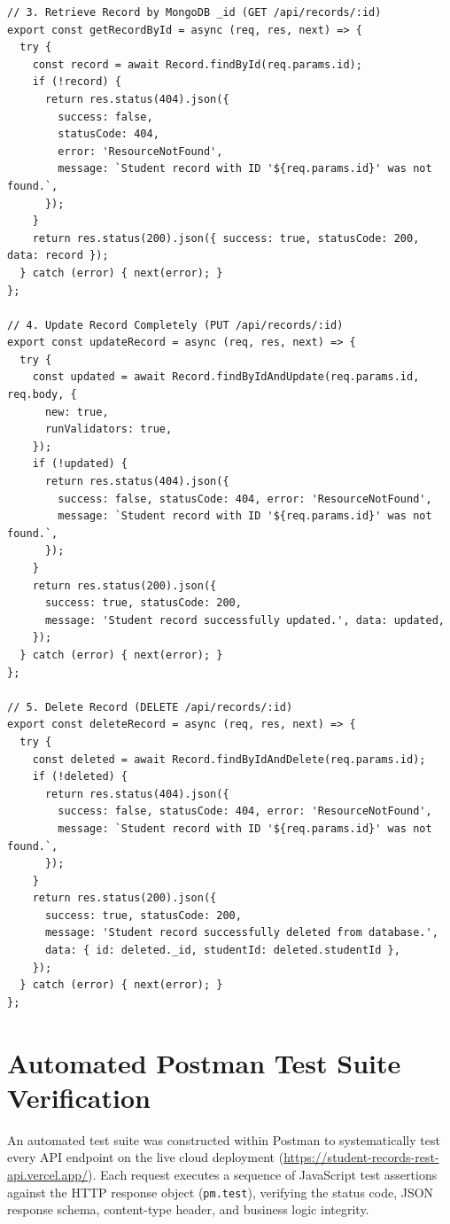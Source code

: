 \documentclass[11pt,a4paper]{article}
\begin{document}
\begin{lstlisting}[caption={RESTful CRUD Business Logic and Validation Handlers (\texttt{controllers/recordController.js})}]
// 3. Retrieve Record by MongoDB _id (GET /api/records/:id)
export const getRecordById = async (req, res, next) => {
  try {
    const record = await Record.findById(req.params.id);
    if (!record) {
      return res.status(404).json({
        success: false,
        statusCode: 404,
        error: 'ResourceNotFound',
        message: `Student record with ID '${req.params.id}' was not found.`,
      });
    }
    return res.status(200).json({ success: true, statusCode: 200, data: record });
  } catch (error) { next(error); }
};

// 4. Update Record Completely (PUT /api/records/:id)
export const updateRecord = async (req, res, next) => {
  try {
    const updated = await Record.findByIdAndUpdate(req.params.id, req.body, {
      new: true,
      runValidators: true,
    });
    if (!updated) {
      return res.status(404).json({
        success: false, statusCode: 404, error: 'ResourceNotFound',
        message: `Student record with ID '${req.params.id}' was not found.`,
      });
    }
    return res.status(200).json({
      success: true, statusCode: 200,
      message: 'Student record successfully updated.', data: updated,
    });
  } catch (error) { next(error); }
};

// 5. Delete Record (DELETE /api/records/:id)
export const deleteRecord = async (req, res, next) => {
  try {
    const deleted = await Record.findByIdAndDelete(req.params.id);
    if (!deleted) {
      return res.status(404).json({
        success: false, statusCode: 404, error: 'ResourceNotFound',
        message: `Student record with ID '${req.params.id}' was not found.`,
      });
    }
    return res.status(200).json({
      success: true, statusCode: 200,
      message: 'Student record successfully deleted from database.',
      data: { id: deleted._id, studentId: deleted.studentId },
    });
  } catch (error) { next(error); }
};
\end{lstlisting}

\newpage
\section{Automated Postman Test Suite Verification}

An automated test suite was constructed within Postman to systematically test every API endpoint on the live cloud deployment (\url{https://student-records-rest-api.vercel.app/}). Each request executes a sequence of JavaScript test assertions against the HTTP response object (\texttt{pm.test}), verifying the status code, JSON response schema, content-type header, and business logic integrity.
\end{document}
